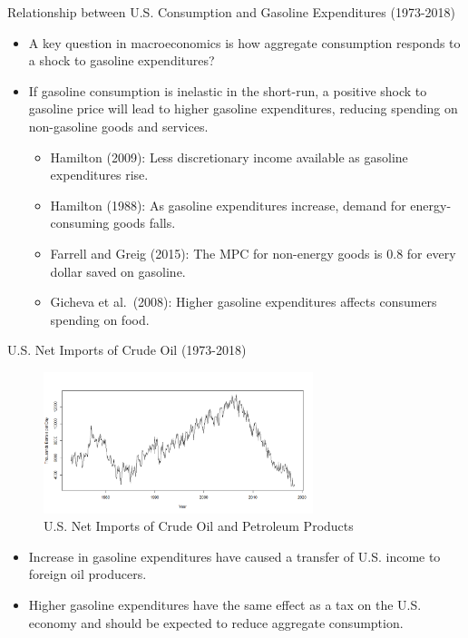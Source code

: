 \documentclass[
  10pt,
  ignorenonframetext,
]{beamer}
\providecommand{\tightlist}{%
  \setlength{\itemsep}{0pt}\setlength{\parskip}{0pt}}
\begin{document}
\begin{frame}{Relationship between U.S. Consumption and Gasoline
Expenditures (1973-2018)}
\protect\hypertarget{relationship-between-u.s.-consumption-and-gasoline-expenditures-1973-2018-2}{}

\begin{itemize}
\item
  A key question in macroeconomics is how aggregate consumption responds
  to a shock to gasoline expenditures?
\item
  If gasoline consumption is inelastic in the short-run, a positive
  shock to gasoline price will lead to higher gasoline expenditures,
  reducing spending on non-gasoline goods and services.

  \begin{itemize}
  \tightlist
  \item
    Hamilton (2009): Less discretionary income available as gasoline
    expenditures rise.\\
  \item
    Hamilton (1988): As gasoline expenditures increase, demand for
    energy-consuming goods falls.
  \item
    Farrell and Greig (2015): The MPC for non-energy goods is 0.8 for
    every dollar saved on gasoline.
  \item
    Gicheva et al.~(2008): Higher gasoline expenditures affects
    consumers spending on food.
  \end{itemize}
\end{itemize}

\end{frame}

\begin{frame}{U.S. Net Imports of Crude Oil (1973-2018)}
\protect\hypertarget{u.s.-net-imports-of-crude-oil-1973-2018}{}

\begin{figure}
\centering
\includegraphics[width=0.7\textwidth,height=\textheight]{Net Imports.png}
\caption{U.S. Net Imports of Crude Oil and Petroleum Products}
\end{figure}

\begin{itemize}
\item
  Increase in gasoline expenditures have caused a transfer of U.S.
  income to foreign oil producers.
\item
  Higher gasoline expenditures have the same effect as a tax on the U.S.
  economy and should be expected to reduce aggregate consumption.
\end{itemize}

\end{frame}
\end{document}
